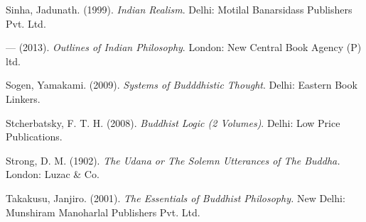 \begin{thebibliography}{99}
  Sinha, Jadunath. (1999). \textit{Indian Realism}. Delhi: Motilal Banarsidass Publishers Pvt. Ltd.

  — (2013). \textit{Outlines of Indian Philosophy}. London: New Central Book Agency (P) ltd.

  Sogen, Yamakami. (2009). \textit{Systems of Budddhistic Thought}. Delhi: Eastern Book Linkers.

  Stcherbatsky, F. T. H. (2008). \textit{Buddhist Logic (2 Volumes)}. Delhi: Low Price Publications.

  Strong, D. M. (1902). \textit{The Udana or The Solemn Utterances of The Buddha.} London: Luzac \& Co.

  Takakusu, Janjiro. (2001). \textit{The Essentials of Buddhist Philosophy.} New Delhi: Munshiram Manoharlal Publishers Pvt. Ltd.
 
 \end{thebibliography}

\theendnotes

